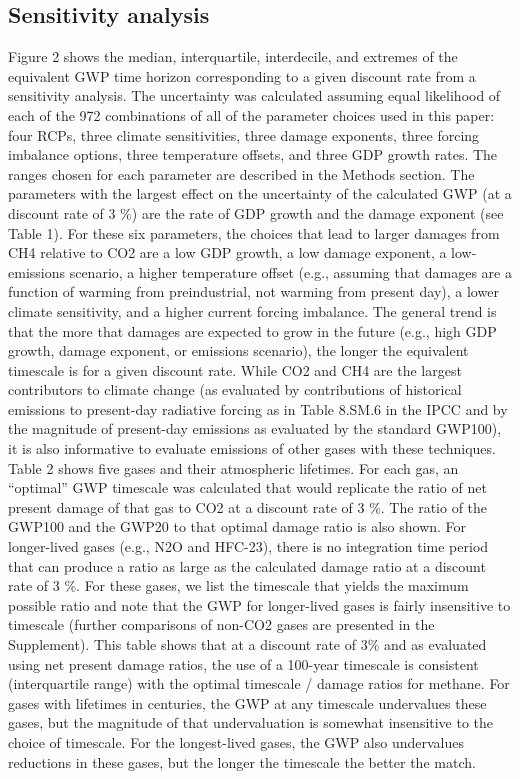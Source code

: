 \documentclass[gc, manuscript]{copernicus}
\begin{document}
\subsection{Sensitivity analysis}

Figure 2 shows the median, interquartile, interdecile, and extremes of
the equivalent GWP time horizon corresponding to a given discount rate
from a sensitivity analysis. The uncertainty was calculated assuming
equal likelihood of each of the 972 combinations of all of the parameter
choices used in this paper: four RCPs, three climate sensitivities,
three damage exponents, three forcing imbalance options, three
temperature offsets, and three GDP growth rates. The ranges chosen for
each parameter are described in the Methods section. The parameters with
the largest effect on the uncertainty of the calculated GWP (at a
discount rate of 3 \%) are the rate of GDP growth and the damage
exponent (see Table 1). For these six parameters, the choices that lead
to larger damages from CH4 relative to CO2 are a low GDP growth, a low
damage exponent, a low-emissions scenario, a higher temperature offset
(e.g., assuming that damages are a function of warming from
preindustrial, not warming from present day), a lower climate
sensitivity, and a higher current forcing imbalance. The general trend
is that the more that damages are expected to grow in the future (e.g.,
high GDP growth, damage exponent, or emissions scenario), the longer the
equivalent timescale is for a given discount rate. While CO2 and CH4 are
the largest contributors to climate change (as evaluated by
contributions of historical emissions to present-day radiative forcing
as in Table 8.SM.6 in the IPCC and by the magnitude of present-day
emissions as evaluated by the standard GWP100), it is also informative
to evaluate emissions of other gases with these techniques. Table 2
shows five gases and their atmospheric lifetimes. For each gas, an
``optimal'' GWP timescale was calculated that would replicate the ratio
of net present damage of that gas to CO2 at a discount rate of 3 \%. The
ratio of the GWP100 and the GWP20 to that optimal damage ratio is also
shown. For longer-lived gases (e.g., N2O and HFC-23), there is no
integration time period that can produce a ratio as large as the
calculated damage ratio at a discount rate of 3 \%. For these gases, we
list the timescale that yields the maximum possible ratio and note that
the GWP for longer-lived gases is fairly insensitive to timescale
(further comparisons of non-CO2 gases are presented in the Supplement).
This table shows that at a discount rate of 3\% and as evaluated using
net present damage ratios, the use of a 100-year timescale is consistent
(interquartile range) with the optimal timescale / damage ratios for
methane. For gases with lifetimes in centuries, the GWP at any timescale
undervalues these gases, but the magnitude of that undervaluation is
somewhat insensitive to the choice of timescale. For the longest-lived
gases, the GWP also undervalues reductions in these gases, but the
longer the timescale the better the match.
\end{document}
